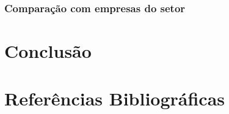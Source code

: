 \documentclass[aprovado,numbers]{coppe}
\begin{document}
  \hypertarget{comparauxe7uxe3o-com-empresas-do-setor}{%
  \subsection{Comparação com empresas do setor}\label{comparauxe7uxe3o-com-empresas-do-setor}}

  \hypertarget{conclusuxe3o}{%
  \chapter{Conclusão}\label{conclusuxe3o}}

  \backmatter

  \hypertarget{referuxeancias-bibliogruxe1ficas}{%
  \chapter*{Referências Bibliográficas}\label{referuxeancias-bibliogruxe1ficas}}


  \label{bib:begin}
  \noindent

  \setlength{\parindent}{-0.20in}
  \setlength{\leftskip}{0.20in}
  \setlength{\parskip}{8pt}
\end{document}
